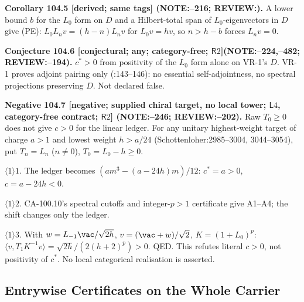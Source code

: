 \textbf{Corollary 104.5 [derived; same tags] (NOTE:--216; REVIEW:).}
A lower bound \(b\) for the \(L_0\) form on \(D\) and a Hilbert-total span of \(L_0\)-eigenvectors in \(D\) give (PE):
\(L_0L_nv=(h-n)L_nv\) for \(L_0v=hv\), so \(n>h-b\) forces \(L_nv=0\).

\textbf{Conjecture 104.6 [conjectural; any; category-free; \(\mathsf R2\)]\newline (NOTE:--224,--482; REVIEW:--194).}
\(c^*>0\) from positivity of the \(L_0\) form alone on VR-1's \(D\). VR-1 proves adjoint pairing only
(:143--146): no essential self-adjointness, no spectral projections preserving \(D\). Not declared false.

\textbf{Negative 104.7 [negative; supplied chiral target, no local tower; \(\mathsf L4\), category-free contract; \(\mathsf R2\)] (NOTE:--246; REVIEW:--202).}
Raw \(T_0\ge0\) does not give \(c>0\) for the linear ledger. For any unitary highest-weight target of charge \(a>1\) and
lowest weight \(h>a/24\) (Schottenloher:2985--3004, 3044--3054), put \(T_n=L_n\) (\(n\neq0\)), \(T_0=L_0-h\ge0\).
\par\(\langle1\rangle1\). The ledger becomes \((am^3-(a-24h)m)/12\): \(c^*=a>0\), \(c=a-24h<0\).
\par\(\langle1\rangle2\). CA-100.10's spectral cutoffs and integer-\(p>1\) certificate give A1--A4; the shift changes only the ledger.
\par\(\langle1\rangle3\). With \(w=L_{-1}\vac/\sqrt{2h}\), \(v=(\vac+w)/\sqrt2\), \(K=(1+L_0)^p\): \(\langle v,T_1K^{-1}v\rangle=\sqrt{2h}/(2(h+2)^p)>0\). QED.
This refutes literal \(c>0\), not positivity of \(c^*\). No local categorical realisation is asserted.

\subsection{Entrywise Certificates on the Whole Carrier}

